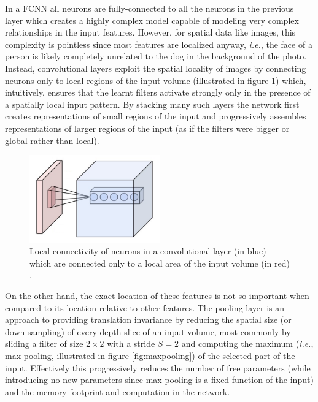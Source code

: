 In a \ac{FCNN} all neurons are fully-connected to all the neurons in the previous layer which creates a highly complex model capable of modeling very complex relationships in the input features. However, for spatial data like images, this complexity is pointless since most features are localized anyway, \textit{i.e.}, the face of a person is likely completely unrelated to the dog in the background of the photo. Instead, convolutional layers exploit the spatial locality of images by connecting neurons only to local regions of the input volume (illustrated in figure \ref{fig:localconnectivity}) which, intuitively, ensures that the learnt filters activate strongly only in the presence of a spatially local input pattern. By stacking many such layers the network first creates representations of small regions of the input and progressively assembles representations of larger regions of the input (as if the filters were bigger or global rather than local).

\begin{figure}[ht]
    \centering
    \includegraphics[width=0.5\textwidth]{figs/localconnectivity.png}
    \caption{Local connectivity of neurons in a convolutional layer (in blue) which are connected only to a local area of the input volume (in red) \cite{cs231n}.}
    \label{fig:localconnectivity}
\end{figure}

On the other hand, the exact location of these features is not so important when compared to its location relative to other features. The pooling layer is an approach to providing translation invariance by reducing the spatial size (or down-sampling) of every depth slice of an input volume, most commonly by sliding a filter of size $2 \times 2$ with a stride $S = 2$ and computing the maximum (\textit{i.e.}, max pooling, illustrated in figure \ref{fig:maxpooling}) of the selected part of the input. Effectively this progressively reduces the number of free parameters (while introducing no new parameters since max pooling is a fixed function of the input) and the memory footprint and computation in the network.

